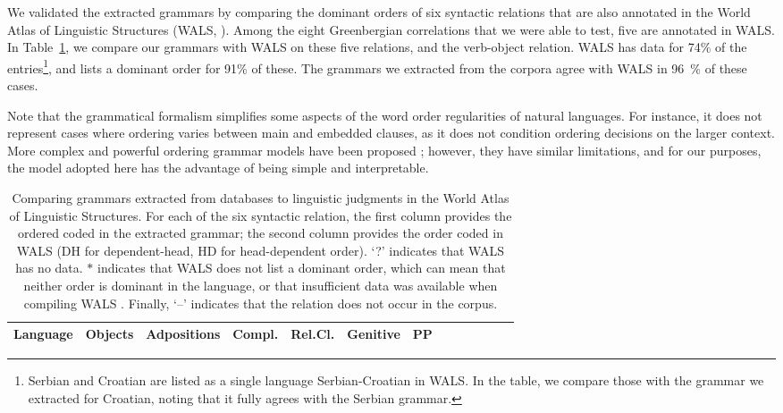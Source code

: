 \documentclass[10pt,twoside,lineno]{article}
\begin{document}
We validated the extracted grammars by comparing the dominant orders of six syntactic relations that are also annotated in the World Atlas of Linguistic Structures (WALS, \cite{haspelmath2005world}).
Among the eight Greenbergian correlations that we were able to test, five are annotated in WALS.
In Table~\ref{tab:grammars-wals}, we compare our grammars with WALS on these five relations, and the verb-object relation.
WALS has data for 74\% of the entries\footnote{Serbian and Croatian are listed as a single language Serbian-Croatian in WALS. In the table, we compare those with the grammar we extracted for Croatian, noting that it fully agrees with the Serbian grammar.}, and lists a dominant order for 91\% of these.
The grammars we extracted from the corpora agree with WALS in 96~\%  of these cases.


Note that the grammatical formalism simplifies some aspects of the word order regularities of natural languages.
For instance, it does not represent cases where ordering varies between main and embedded clauses, as it does not condition ordering decisions on the larger context.
More complex and powerful ordering grammar models have been proposed \cite{futrell2015experiments, wang2016galactic}; however, they have similar limitations, and for our purposes, the model adopted here has the advantage of being simple and interpretable.



\begin{table}
\small{
\begin{center}
\begin{tabular}{l||ll|ll|ll|ll|ll|ll|llllll}
		   Language 
		   &	\multicolumn{2}{|c|}{Objects} 
		   &	\multicolumn{2}{|c|}{Adpositions} 
		   &	\multicolumn{2}{|c|}{Compl.} 
		   &	\multicolumn{2}{|c|}{Rel.Cl.} 
		   &	\multicolumn{2}{|c|}{Genitive} 
		   &	\multicolumn{2}{|c|}{PP}  \\ \hline\hline
	
\end{tabular}
\end{center}
}
\caption{Comparing grammars extracted from databases to linguistic judgments in the World Atlas of Linguistic Structures. For each of the six syntactic relation, the first column provides the ordered coded in the extracted grammar; the second column provides the order coded in WALS (DH for dependent-head, HD for head-dependent order). `?' indicates that WALS has no data.
$*$ indicates that WALS does not list a dominant order, which can mean that neither order is dominant in the language, or that insufficient data was available when compiling WALS \citep{dryer2011evidence}.
Finally, `--' indicates that the relation does not occur in the corpus.
}\label{tab:grammars-wals}
\end{table}
\end{document}
